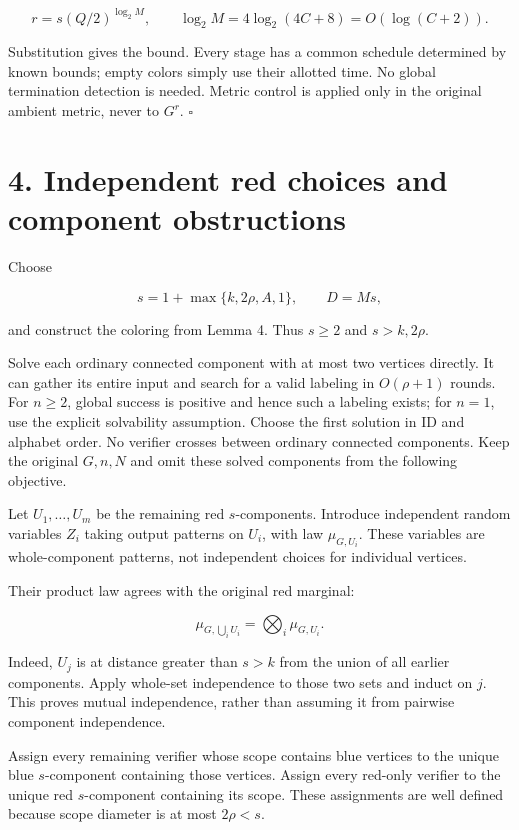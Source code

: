 \documentclass[11pt,a4paper]{article}
\begin{document}
\[ r=s(Q/2)^{\log_2M},\qquad \log_2M=4\log_2(4C+8)=O(\log(C+2)). \]

Substitution gives the bound.
Every stage has a common schedule determined by known bounds; empty colors simply use their allotted time.
No global termination detection is needed.
Metric control is applied only in the original ambient metric, never to \(G^r\). \(\square\)

\section{4. Independent red choices and component obstructions}\label{independent-red-choices-and-component-obstructions}

Choose

\[ s=1+\max\{k,2\rho,A,1\},\qquad D=Ms, \]

and construct the coloring from Lemma 4.
Thus \(s\ge2\) and \(s>k,2\rho\).

Solve each ordinary connected component with at most two vertices directly.
It can gather its entire input and search for a valid labeling in \(O(\rho+1)\) rounds.
For \(n\ge2\), global success is positive and hence such a labeling exists; for \(n=1\), use the explicit solvability assumption.
Choose the first solution in ID and alphabet order.
No verifier crosses between ordinary connected components.
Keep the original \(G,n,N\) and omit these solved components from the following objective.

Let \(U_1,\ldots,U_m\) be the remaining red \(s\)-components.
Introduce independent random variables \(Z_i\) taking output patterns on \(U_i\), with law \(\mu_{G,U_i}\).
These variables are whole-component patterns, not independent choices for individual vertices.

Their product law agrees with the original red marginal:

\[ \mu_{G,\bigcup_iU_i}=\bigotimes_i\mu_{G,U_i}. \]

Indeed, \(U_j\) is at distance greater than \(s>k\) from the union of all earlier components.
Apply whole-set independence to those two sets and induct on \(j\).
This proves mutual independence, rather than assuming it from pairwise component independence.

Assign every remaining verifier whose scope contains blue vertices to the unique blue \(s\)-component containing those vertices.
Assign every red-only verifier to the unique red \(s\)-component containing its scope.
These assignments are well defined because scope diameter is at most \(2\rho<s\).
\end{document}
